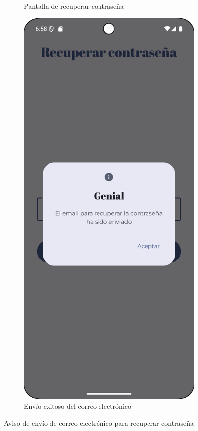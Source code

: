 \begin{figure}[H]
\begin{subfigure}[b]{0.3\textwidth}
      \caption{Pantalla de recuperar contraseña}
      \label{fig:reset-password-main}
    \end{subfigure}
    \hfill
    \begin{subfigure}[b]{0.3\textwidth}
      \includegraphics[width=\textwidth]{./img/manual/send_email_success.png}
      \caption{Envío exitoso del correo electrónico}
      \label{fig:reset-password-succeeds}
    \end{subfigure}
    \hfill
    \caption{Aviso de envío de correo electrónico para recuperar contraseña}
    \label{fig:reset-password}
\end{figure}


